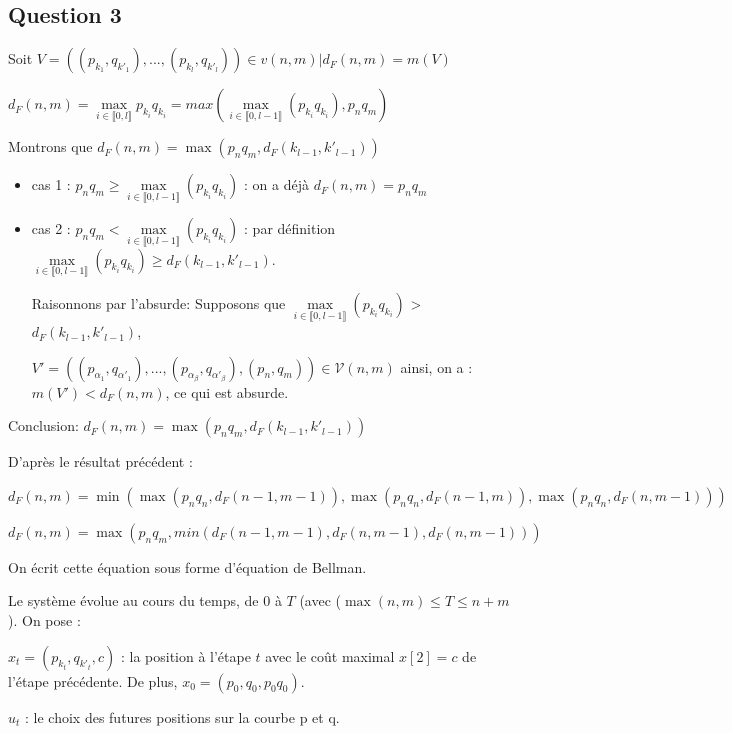 \documentclass[paper=a4, fontsize=11pt]{scrartcl} %
\begin{document}
\subsection*{Question 3}
Soit $V=((p_{k_1}, q_{k'_1}), ..., (p_{k_l}, q_{k'_l})) \in v(n, m) \vert d_F(n, m) = m(V)$

$d_F(n, m) = \underset{i \in \llbracket 0, l\rrbracket}{\max} p_{k_i} q_{k_i} = max (\underset{i \in \llbracket 0, l-1\rrbracket}{\max} (p_{k_i} q_{k_i}), p_n q_m)$

Montrons que $d_F(n, m) = \max(p_n q_m, d_F(k_{l-1}, k'_{l-1}))$

\begin{itemize}

\item cas 1 : $p_n q_m \geq \underset{i \in \llbracket 0, l-1\rrbracket}{\max} (p_{k_i} q_{k_i})$ : on a déjà $d_F(n, m) = p_n q_m$

\item cas 2 : $p_n q_m < \underset{i \in \llbracket 0, l-1\rrbracket}{\max} (p_{k_i} q_{k_i})$ : par définition $\underset{i \in \llbracket 0, l-1\rrbracket}{\max}(p_{k_i} q_{k_i}) \geq d_F(k_{l-1}, k'_{l-1})$.

Raisonnons par l'absurde: Supposons que $\underset{i \in \llbracket 0, l-1\rrbracket}{\max}(p_{k_i} q_{k_i})$ > $d_F(k_{l-1}, k'_{l-1})$,

$V'=((p_{\alpha_1}, q_{\alpha'_1}), ..., (p_{\alpha_\beta}, q_{\alpha'_\beta}), (p_{n}, q_{m})) \in \mathcal{V} (n, m)$ ainsi, on a : $m(V') < d_F(n, m)$, ce qui est absurde.
\end{itemize}
Conclusion: $d_F(n, m) = \max(p_n q_m, d_F(k_{l-1}, k'_{l-1}))$

D'après le résultat précédent :

$ d_F(n, m) = \min (\max(p_n q_n, d_F(n-1, m-1)), \max(p_n q_n, d_F(n-1, m)), \max(p_n q_n, d_F(n, m-1))) $


$ d_F(n, m) = \max (p_n q_m, min(d_F(n-1, m-1), d_F(n, m-1), d_F(n, m-1))) $

On écrit cette équation sous forme d'équation de Bellman.

Le système évolue au cours du temps, de $0$ à $T$ (avec ($\max(n,m) \leq T \leq n+m$). On pose :

$x_{t} = (p_{k_t}, q_{k'_t}, c)$ : la position à l'étape $t$ avec le coût maximal $x[2] = c$ de l'étape précédente. De plus, $x_{0} = (p_0, q_0, p_0q_0)$.

$u_t$ : le choix des futures positions sur la courbe p et q.
\end{document}
